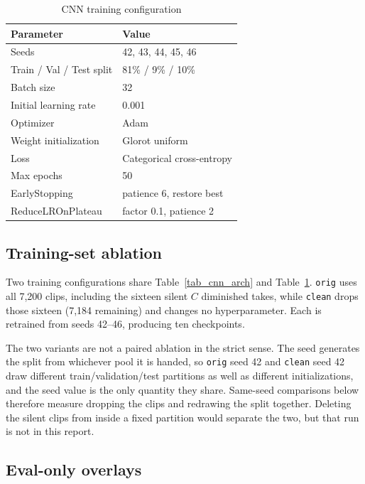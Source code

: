 \documentclass[pdflatex,sn-mathphys-num,iicol]{sn-jnl}
\begin{document}
\begin{table}[t]
\caption{CNN training configuration}\label{tab_cnn_train}
\begin{tabular}{@{}ll@{}}
\toprule
Parameter & Value \\
\midrule
Seeds & 42, 43, 44, 45, 46 \\
Train / Val / Test split & 81\% / 9\% / 10\% \\
Batch size & 32 \\
Initial learning rate & 0.001 \\
Optimizer & Adam \\
Weight initialization & Glorot uniform \\
Loss & Categorical cross-entropy \\
Max epochs & 50 \\
EarlyStopping & patience 6, restore best \\
ReduceLROnPlateau & factor 0.1, patience 2 \\
\bottomrule
\end{tabular}
\end{table}

\subsection{Training-set ablation}\label{subsec_ablation}

Two training configurations share Table~\ref{tab_cnn_arch} and Table~\ref{tab_cnn_train}. \texttt{orig} uses all 7{,}200 clips, including the sixteen silent $C$ diminished takes, while \texttt{clean} drops those sixteen (7{,}184 remaining) and changes no hyperparameter. Each is retrained from seeds 42--46, producing ten checkpoints.

The two variants are not a paired ablation in the strict sense. The seed generates the split from whichever pool it is handed, so \texttt{orig} seed 42 and \texttt{clean} seed 42 draw different train/validation/test partitions as well as different initializations, and the seed value is the only quantity they share. Same-seed comparisons below therefore measure dropping the clips and redrawing the split together. Deleting the silent clips from inside a fixed partition would separate the two, but that run is not in this report.

\subsection{Eval-only overlays}\label{subsec_noise}
\end{document}
